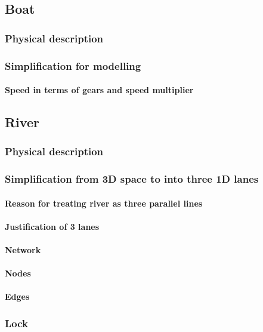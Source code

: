     \subsection{Boat}
      \subsubsection{Physical description}
      \subsubsection{Simplification for modelling}
        \paragraph{Speed in terms of gears and speed multiplier}
        
    \subsection{River}
      \subsubsection{Physical description}
      \subsubsection{Simplification from 3D space to into three 1D lanes}
        \paragraph{Reason for treating river as three parallel lines}
        \paragraph{Justification of 3 lanes}
        \paragraph{Network}
        \paragraph{Nodes}
        \paragraph{Edges}
        
      \subsubsection{Lock}

